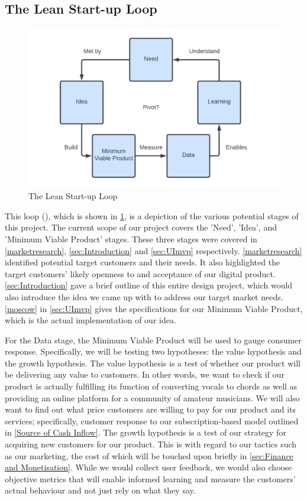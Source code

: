 \subsection{The Lean Start-up Loop}

\begin{figure}
    \centering
    \includegraphics[width=0.8\columnwidth]{Figures/Lean Startup loop}
    \decoRule
    \caption{The Lean Start-up Loop}
    \label{fig:leanloop}
    \end{figure}
    

This loop (\cite{leanstartuploop}), which is shown in \cref{fig:leanloop}, is a depiction of the various potential stages of this project. The current scope of our project covers the 'Need', 'Idea', and 'Minimum Viable Product' stages. These three stages were covered in \cref{marketresearch}, \cref{sec:Introduction} and \cref{sec:UImvp} respectively. \cref{marketresearch} identified potential target customers and their needs. It also highlighted the target customers' likely openness to and acceptance of our digital product. \cref{sec:Introduction} gave a brief outline of this entire design project, which would also introduce the idea we came up with to address our target market needs. \cref{moscow} in \cref{sec:UImvp} gives the specifications for our Minimum Viable Product, which is the actual implementation of our idea. 

For the Data stage, the Minimum Viable Product will be used to gauge consumer response. 
Specifically, we will be testing two hypotheses: the value hypothesis and the growth hypothesis. 
The value hypothesis is a test of whether our product will be delivering any value to customers. 
In other words, we want to check if our product is actually fulfilling its function of converting vocals to chords as well as providing an online platform for a community of amateur musicians. 
We will also want to find out what price customers are willing to pay for our product and its services; specifically, customer response to our subscription-based model outlined in \cref{Source of Cash Inflow}.  
The growth hypothesis is a test of our strategy for acquiring new customers for our product. This is with regard to our tactics such as our marketing, the cost of which will be touched upon briefly in \cref{sec:Finance and Monetisation}. 
While we would collect user feedback, we would also choose objective metrics that will enable informed learning and measure the customers' actual behaviour and not just rely on what they say.

